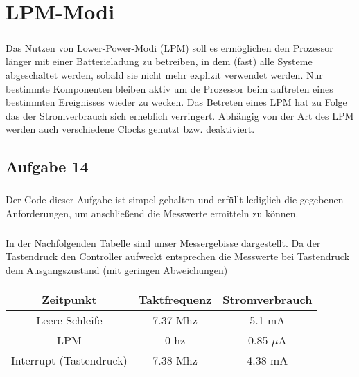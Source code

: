 
\chapter{LPM-Modi}

\paragraph*{}
Das Nutzen von Lower-Power-Modi (LPM) soll es ermöglichen den Prozessor länger mit einer Batterieladung zu betreiben, in dem (fast) alle Systeme abgeschaltet werden, sobald sie nicht mehr explizit verwendet werden. Nur bestimmte Komponenten bleiben aktiv um de Prozessor beim auftreten eines bestimmten Ereignisses wieder zu wecken. Das Betreten eines LPM hat zu Folge das der Stromverbrauch sich erheblich verringert. Abhängig von der Art des LPM werden auch verschiedene Clocks genutzt bzw. deaktiviert.


\section*{Aufgabe 14}

\paragraph*{}
Der Code dieser Aufgabe ist simpel gehalten und erfüllt lediglich die gegebenen Anforderungen, um anschließend die Messwerte ermitteln zu können.





\paragraph*{}
In der Nachfolgenden Tabelle sind unser Messergebisse dargestellt. Da der Tastendruck den Controller aufweckt entsprechen die Messwerte bei Tastendruck dem Ausgangszustand (mit geringen Abweichungen) \\

\begin{tabular}{ c | c | c }\hline \hline
Zeitpunkt & Taktfrequenz & Stromverbrauch \\ \hline
Leere Schleife & 7.37 Mhz & 5.1 mA \\ \hline
LPM & 0 hz & 0.85 $\mu$A \\ \hline
Interrupt (Tastendruck) & 7.38 Mhz & 4.38 mA \\ \hline
\end{tabular}


